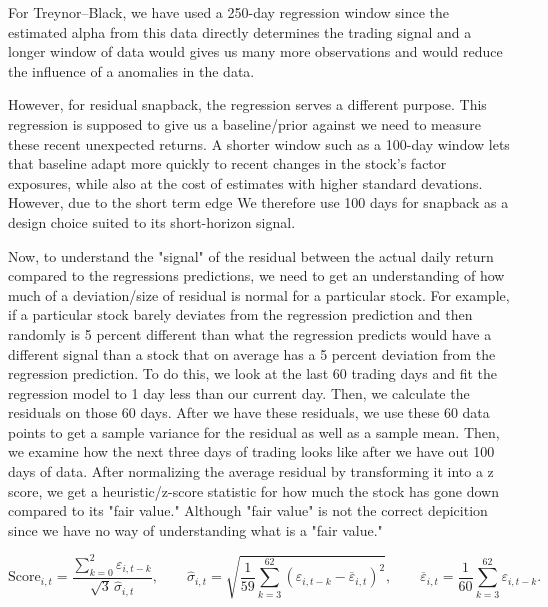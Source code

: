 \documentclass[12pt,letterpaper]{article}
\begin{document}
For Treynor–Black, we have used a 250-day regression window since the estimated alpha from this data directly determines the trading signal and a longer window of data would gives us many more observations and would reduce the influence of a  anomalies in the data. 

However, for residual snapback, the regression serves a different purpose. This regression is supposed to give us a baseline/prior against we need to measure these recent unexpected returns. A shorter window such as a 100-day window lets that baseline adapt more quickly to recent changes in the stock’s factor exposures, while also at the cost of estimates with higher standard devations.  However, due to the short term edge We therefore use 100 days for snapback as a design choice suited to its short-horizon signal.
\quad

Now, to understand the "signal" of the residual between the actual daily return compared to the regressions predictions, we need to get an understanding of how much of a deviation/size of residual is normal for a particular stock. For example, if a particular stock barely deviates from the regression prediction and then randomly is 5 percent different than what the regression predicts would have a different signal than a stock that on average has a 5 percent deviation from the regression prediction. To do this, we look at the last 60 trading days and fit the regression model to 1 day less than our current day. Then, we calculate the residuals on those 60 days. After we have these residuals, we use these 60 data points to get a sample variance for the residual as well as a sample mean. Then, we examine how the next three days of trading looks like after we have out 100 days of data. After normalizing the average residual by transforming it into a z score, we get a heuristic/z-score statistic for how much the stock has gone down compared to its "fair value." Although "fair value" is not the correct depicition since we have no way of understanding what is a "fair value." 

\[
\mathrm{Score}_{i,t}
=
\frac{\displaystyle\sum_{k=0}^{2}\varepsilon_{i,t-k}}
     {\sqrt{3}\,\widehat{\sigma}_{i,t}},
\qquad
\widehat{\sigma}_{i,t}
=
\sqrt{\frac{1}{59}
\sum_{k=3}^{62}
\left(\varepsilon_{i,t-k}-\overline{\varepsilon}_{i,t}\right)^2},
\qquad
\overline{\varepsilon}_{i,t}
=
\frac{1}{60}\sum_{k=3}^{62}\varepsilon_{i,t-k}.
\]
\end{document}
